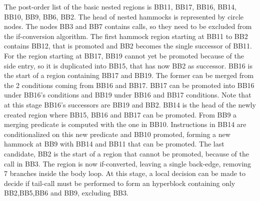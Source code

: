  The post-order list of the basic nested regions is {BB11, BB17, BB16, BB14, BB10, BB9, BB6, BB2}. The head of nested hammocks is represented by circle nodes. The nodes BB3 and BB7 contains calls, so they need to be excluded from the if-conversion algorithm.
The first hammock region starting at BB11 to BB2 contains BB12, that is promoted and BB2 becomes the single successor of BB11. 
For the region starting at BB17, BB19 cannot yet be promoted because of the side entry, so it is duplicated into BB15, that has now BB2 as successor.
BB16 is the start of a region containing BB17 and BB19. The former can be merged from the 2 conditions coming from BB16 and BB17. BB17 can be promoted into BB16 under BB16's conditions and BB19 under BB16 and BB17 conditions. Note that at this stage BB16's successors are BB19 and BB2.
BB14 is the head of the newly created region where BB15, BB16 and BB17 can be promoted. From BB9 a merging predicate is computed with the one in BB10. Instructions in BB14 are conditionalized on this new predicate and BB10 promoted, forming a new hammock at BB9 with BB14 and BB11 that can be promoted. The last candidate, BB2 is the start of a region that cannot be promoted, because of the call in BB3.
The region is now if-converted, leaving a single back-edge, removing 7 branches inside the body loop. At this stage, a local decision can be made to decide if tail-call must be performed to form an hyperblock containing only BB2,BB5,BB6 and BB9, excluding BB3. 

